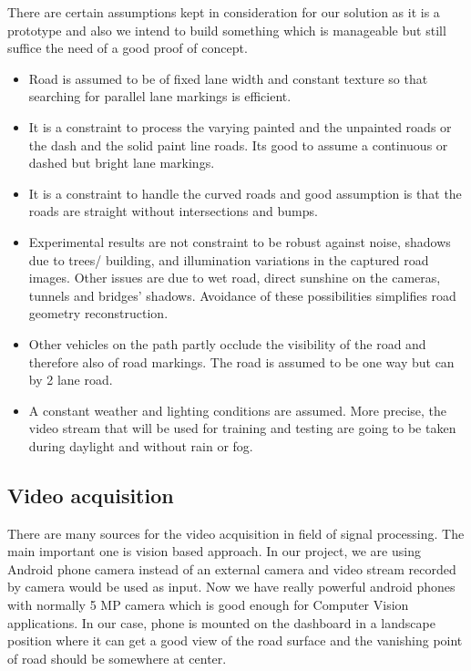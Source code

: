 There are certain assumptions kept in consideration for our solution as it is a
prototype and also we intend to build something which is manageable but still
suffice the need of a good proof of concept. 


\begin{itemize}
\item Road is assumed to be of fixed lane width and constant texture so that
searching for parallel lane markings is efficient.
\item It is a constraint to process the varying painted and the unpainted roads or
the dash and the solid paint line roads. Its good to assume a continuous or dashed but bright
lane markings.
\item It is a constraint to handle the curved roads and good assumption is that the
roads are straight without intersections and bumps.
\item Experimental results are not constraint to be robust against noise, shadows
due to trees/ building, and illumination variations in the captured road images. Other issues
are due to wet road, direct sunshine on the cameras, tunnels and bridges' shadows.
Avoidance of these possibilities simplifies road geometry reconstruction. 
\item Other vehicles on the path partly occlude the visibility of the road and
    therefore also of road markings. The road is assumed to be one way but can by 2 lane road.
\item A constant weather and lighting conditions are assumed. More precise, the 
    video stream that will be used for training and testing are going to be taken 
    during daylight and without rain or fog.
\end{itemize}

\subsection{Video acquisition}

There are many sources for the video acquisition in field of signal processing.
The main important one is vision based approach. In our project, we are using
Android phone camera instead of an external camera and video stream recorded by camera would
be used as input. Now we have really powerful android phones with normally 5 MP camera
which is good enough for Computer Vision applications. In our case, phone is mounted on the
dashboard in a landscape position where it can get a good view of the road surface and the
vanishing point of road should be somewhere at center.

